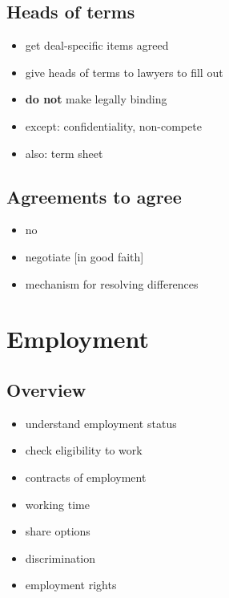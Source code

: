 \subsection{Heads of terms}\label{heads-of-terms}

\begin{itemize}
\itemsep1pt\parskip0pt
\item
  get deal-specific items agreed
\item
  give heads of terms to lawyers to fill out
\item
  \textbf{do not} make legally binding
\item
  except: confidentiality, non-compete
\item
  also: term sheet
\end{itemize}

\subsection{Agreements to agree}\label{agreements-to-agree}

\begin{itemize}
\itemsep1pt\parskip0pt
\item
  no
\item
  negotiate {[}in good faith{]}
\item
  mechanism for resolving differences
\end{itemize}

\section{Employment}\label{employment}

\subsection{Overview}\label{overview-2}

\begin{itemize}
\itemsep1pt\parskip0pt
\item
  understand employment status
\item
  check eligibility to work
\item
  contracts of employment
\item
  working time
\item
  share options
\item
  discrimination
\item
  employment rights
\end{itemize}

